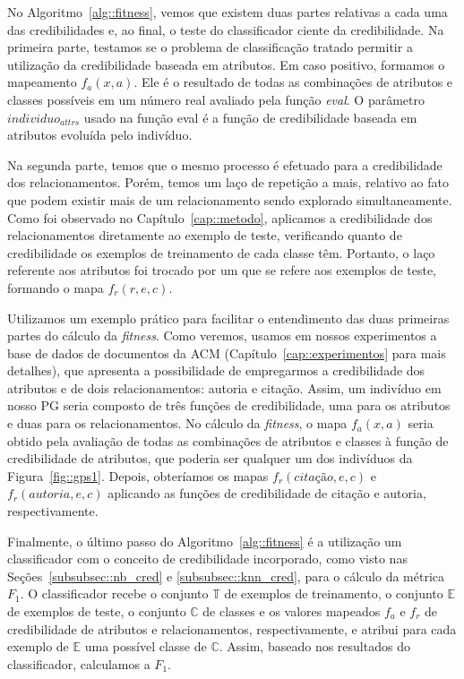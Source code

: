 No Algoritmo~\ref{alg::fitness}, vemos que existem duas partes relativas a cada uma das credibilidades e, ao final, o teste do classificador ciente da credibilidade.
Na primeira parte, testamos se o problema de classificação tratado permitir a utilização da credibilidade baseada em atributos. Em caso positivo, formamos o mapeamento $f_a(x,a)$. Ele é o resultado de todas as combinações de atributos e classes possíveis em um número real avaliado pela função \textit{eval}. %
O parâmetro $individuo_{attrs}$ usado na função eval é a função de credibilidade baseada em atributos evoluída pelo indivíduo.

Na segunda parte, temos que o mesmo processo é efetuado para a credibilidade dos relacionamentos. Porém, temos um laço de repetição a mais, relativo ao fato que podem existir mais de um relacionamento sendo explorado simultaneamente. Como foi observado no Capítulo~\ref{cap::metodo}, aplicamos a credibilidade dos relacionamentos diretamente ao exemplo de teste, verificando quanto de credibilidade os exemplos de treinamento de cada classe têm. Portanto, o laço referente aos atributos foi trocado por um que se refere aos exemplos de teste, formando o mapa $f_r(r,e,c)$.

Utilizamos um exemplo prático para facilitar o entendimento das duas primeiras partes do cálculo da \textit{fitness}. Como veremos, usamos em nossos experimentos a base de dados de documentos da \textsc{ACM} (Capítulo~\ref{cap::experimentos} para mais detalhes), que apresenta a possibilidade de empregarmos a credibilidade dos atributos e de dois relacionamentos: autoria e citação. Assim, um indivíduo em nosso \textsc{PG} seria composto de três funções de credibilidade, uma para os atributos e duas para os relacionamentos. No cálculo da \textit{fitness}, o mapa $f_a(x,a)$ seria obtido pela avaliação de todas as combinações de atributos e classes à função de credibilidade de atributos, que poderia ser qualquer um dos indivíduos da Figura~\ref{fig::gps1}. Depois, obteríamos os mapas $f_r(\textit{citação},e,c)$ e $f_r(autoria,e,c)$ aplicando as funções de credibilidade de citação e autoria, respectivamente.

Finalmente, o último passo do Algoritmo~\ref{alg::fitness} é a utilização um classificador com o conceito de credibilidade incorporado, como visto nas Seções~\ref{subsubsec::nb_cred} e \ref{subsubsec::knn_cred}, para o cálculo da métrica \textit{$F_1$}.
O classificador recebe o conjunto $\mathbb{T}$ de exemplos de treinamento, o conjunto $\mathbb{E}$ de exemplos de teste, o conjunto $\mathbb{C}$ de classes e os valores mapeados $f_a$ e $f_r$ de credibilidade de atributos e relacionamentos, respectivamente, e atribui para cada exemplo de $\mathbb{E}$ uma possível classe de $\mathbb{C}$.
Assim, baseado nos resultados do classificador, calculamos a \textit{$F_1$}.




